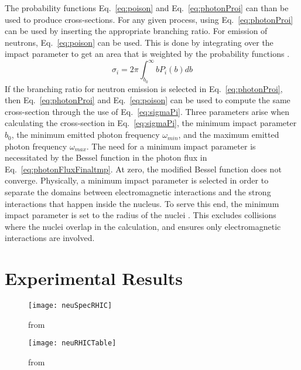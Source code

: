     The probability functions Eq.~\ref{eq:poison} and Eq.~\ref{eq:photonProi} can than be used to produce 
      cross-sections.
    For any given process, using Eq.~\ref{eq:photonProi} can be used by inserting the appropriate
      branching ratio.
    For emission of neutrons, Eq.~\ref{eq:poison} can be used.
    This is done by integrating over the impact parameter to get an area that 
      is weighted by the probability functions \cite{emPCite3,emPCite4}.
      \begin{equation}
        \sigma_{i}=2\pi\int^{\infty}_{b_{0}}bP_{i}(b)db
        \label{eq:sigmaPi}
      \end{equation}
    If the branching ratio for neutron emission is selected in Eq.~\ref{eq:photonProi}, then 
      Eq.~\ref{eq:photonProi} and Eq.~\ref{eq:poison} can be used to compute the same 
      cross-section through the use of Eq.~\ref{eq:sigmaPi}.
    Three parameters arise when calculating the cross-section in Eq.~\ref{eq:sigmaPi}, the 
      minimum impact parameter $b_{0}$, the minimum emitted photon frequency 
      $\omega_{min}$, and the maximum emitted photon frequency $\omega_{max}$.
    The need for a minimum impact parameter is necessitated by the Bessel 
      function in the photon flux in Eq.~\ref{eq:photonFluxFinaltmp}.
    At zero, the modified Bessel function does not converge.
    Physically, a minimum impact parameter is selected in order to separate the
      domains between electromagnetic interactions and the strong interactions 
      that happen inside the nucleus.
    To serve this end, the minimum impact parameter is set to the radius of the
      nuclei \cite{emPCite3,emPCite4}.
    This excludes collisions where the nuclei overlap in the calculation, and 
      ensures only electromagnetic interactions are involved.

  \section{Experimental Results}

  \begin{figure}[!Hhbt]
    \centering
    \texttt{[image: neuSpecRHIC]}
    \caption{from \cite{upcNeuPHENIX}}
    \label{fig:neuSpecRHIC}
  \end{figure}

  \begin{figure}[!Hhbt]
    \centering
    \texttt{[image: neuRHICTable]}
    \caption{from \cite{upcNeuPHENIX}}
    \label{fig:neuRHICTable}
  \end{figure}

